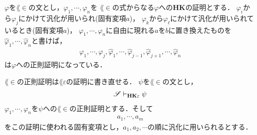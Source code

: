 \begin{metaprf}
		
		
		$\varphi$を$\lang{\in}$の文とし，$\varphi_{1},\cdots,\varphi_{n}$を
		$\lang{\in}$の式からなる$\varphi$への{\bf HK}の証明とする．
		$\varphi_{i}$から$\varphi_{j}$にかけて汎化が用いられ(固有変項$a$)，
		$\varphi_{k}$から$\varphi_{\ell}$にかけて汎化が用いられているとき(固有変項$a$)，
		$\varphi_{1},\cdots,\varphi_{n}$に自由に現れる$a$を$b$に置き換えたものを
		$\hat{\varphi}_{1},\cdots,\hat{\varphi}_{n}$と書けば，
		\begin{align}
			\varphi_{1},\cdots,\varphi_{j},
			\hat{\varphi}_{1},\cdots,\hat{\varphi}_{j-1},\hat{\varphi}_{j+1},
			\cdots,\hat{\varphi}_{n}
		\end{align}
		は$\varphi$への正則証明になっている．
		\QED
	\end{metaprf}
	
	$\lang{\in}$の正則証明は$\lang{\varepsilon}$の証明に書き直せる．
	$\psi$を$\lang{\in}$の文とし，
	\begin{align}
		\mathscr{S} \vdash_{{\scriptsize \mbox{{\bf HK$\varepsilon$}}}} \psi
	\end{align}
	$\varphi_{1},\cdots,\varphi_{n}$を$\psi$への$\lang{\in}$の正則証明とする．そして
	\begin{align}
		a_{1},\cdots,a_{m}
	\end{align}
	をこの証明に使われる固有変項とし，$a_{1},a_{2},\cdots$の順に汎化に用いられるとする．
	
